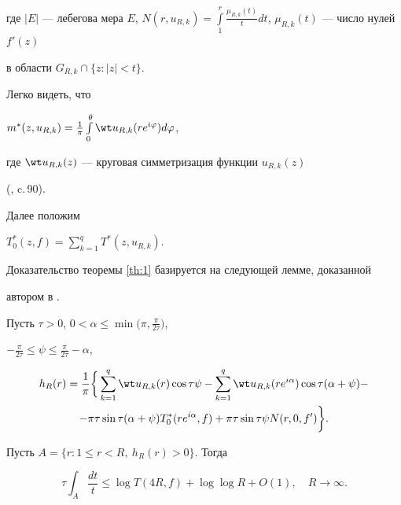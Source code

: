 где $|E|$ --- лебегова мера $E$, $N(r,u_{R,k})= \int\limits_{1}^{r}


\frac{\mu_{R,k}(t)}{t}dt$,  $\mu_{R,k}(t)$ --- число нулей $f'(z)$


в области $G_{R,k} \cap \{ z : |z|<t \}$.





Легко видеть, что


$m^{*}(z,u_{R,k})= \frac{1}{\pi}\int\limits_{0}^{\theta}\wt u_{R,k}


(re^{i\varphi})d\varphi$,


где $\wt u_{R,k}(z)$ --- круговая  симметризация функции $u_{R,k}(z)$


(\cite{15}, c.\,90).





Далее положим \cite{7}


$T_{0}^{*}(z,f)=\sum\limits_{k=1}^{q}T^{*}(z,u_{R,k})$.


Доказательство теоремы \ref{th:1} базируется на следующей лемме, доказанной 


автором в \cite{11}. 





Пусть $\tau > 0$, $0 < \alpha \le \min \big(\pi, \frac{\pi}{2\tau}\big)$,


$-\frac{\pi}{2\tau} \le \psi \le \frac{\pi}{2\tau}-\alpha$,


\begin{multline*}


h_{R}(r)=\frac{1}{\pi}\bigg\{ \sum\limits_{k=1}^{q}


\wt u_{R,k}(r)\cos\tau\psi -\sum\limits_{k=1}^{q}


\wt u_{R,k}(re^{i\alpha})\cos\tau(\alpha+\psi)- \\


%


-\pi\tau\sin\tau(\alpha+\psi)T_{0}^{*}(re^{i\alpha},f)+\pi\tau\sin\tau\psi


N(r,0,f') \bigg\}.


\end{multline*}





\begin{lem}\label{lem:1}


Пусть $A = \{ r : 1 \le r < R,\ h_{R}(r) >0 \}$. Тогда


$$


\tau\int_{A}\frac{dt}{t} \le \log T(4R,f) + \log\log R + O(1),


\quad R\to\infty.


$$


\end{lem}


